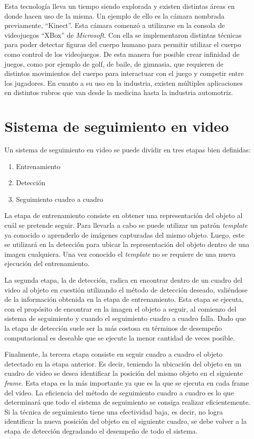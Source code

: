 Esta tecnología lleva un tiempo siendo explorada y existen distintas áreas en donde hacen uso de la misma. Un ejemplo de ello es la cámara nombrada previamente, ``Kinect''. Esta cámara comenzó a utilizarse en la consola de videojuegos ``XBox'' de \textit{Microsoft}. Con ella se implementaron distintas técnicas para poder detectar figuras del cuerpo humano para permitir utilizar el cuerpo como control de los videojuegos. De esta manera fue posible crear infinidad de juegos, como por ejemplo de golf, de baile, de gimnasia, que requieren de distintos movimientos del cuerpo para interactuar con el juego y competir entre los jugadores. En cuanto a su uso en la industria, existen múltiples aplicaciones en distintos rubros que van desde la medicina hasta la industria automotriz.


\chapter{Sistema de seguimiento en video}

Un sistema de seguimiento en video se puede dividir en tres etapas bien definidas:
\begin{enumerate}
 \item Entrenamiento
 \item Detección
 \item Seguimiento cuadro a cuadro
\end{enumerate}

La etapa de entrenamiento consiste en obtener una representación del objeto al cuál se pretende seguir. Para llevarla a cabo se puede utilizar un patrón \textit{template} ya conocido o aprenderlo de imágenes capturadas del mismo objeto. Luego, este se utilizará en la detección para ubicar la representación del objeto dentro de una imagen cualquiera. Una vez conocido el \textit{template} no se requiere de una nueva ejecución del entrenamiento.

La segunda etapa, la de detección, radica en encontrar dentro de un cuadro del video al objeto en cuestión utilizando el método de detección deseado, valiéndose de la información obtenida en la etapa de entrenamiento. Esta etapa se ejecuta, con el propósito de encontrar en la imagen el objeto a seguir, al comienzo del sistema de seguimiento y cuando el seguimiento cuadro a cuadro falla. Dado que la etapa de detección suele ser la más costosa en términos de desempeño computacional es deseable que se ejecute la menor cantidad de veces posible.

Finalmente, la tercera etapa consiste en seguir cuadro a cuadro el objeto detectado en la etapa anterior. Es decir, teniendo la ubicación del objeto en un cuadro de video se desea identificar la posición del mismo objeto en el siguiente \textit{frame}. Esta etapa es la más importante ya que es la que se ejecuta en cada frame del video. La eficiencia del método de seguimiento cuadro a cuadro es lo que determinará que todo el sistema de seguimiento se consiga realizar eficientemente. Si la técnica de seguimiento tiene una efectividad baja, es decir, no logra identificar la nueva posición del objeto en el siguiente cuadro, se debe volver a la etapa de detección degradando el desempeño de todo el sistema.

